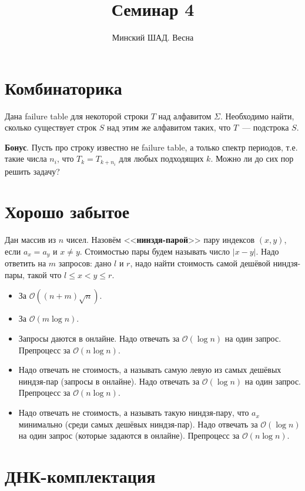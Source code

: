 \documentclass[addpoints]{exam}
\title{Семинар 4}
\author{Минский ШАД. Весна}
\begin{document}
\maketitle

\section{Комбинаторика}

Дана failure table для некоторой строки $T$ над алфавитом $\Sigma$. Необходимо найти, сколько существует строк $S$ над этим же алфавитом таких, что $T$~--- подстрока $S$.

\textbf{Бонус}. Пусть про строку известно не failure table, а только спектр периодов, т.е. такие числа $n_i$, что $T_k = T_{k+n_i}$ для любых подходящих $k$. Можно ли до сих пор решить задачу?

\section{Хорошо забытое}

Дан массив из $n$ чисел. Назовём <<\textbf{нинздя-парой}>> пару индексов $(x,y)$, если $a_x = a_y$ и $x \neq y$. Стоимостью пары будем называть число $|x - y|$. Надо ответить на $m$ запросов: дано $l$ и $r$, надо найти стоимость самой дешёвой ниндзя-пары, такой что $l \leqslant x < y \leqslant r$.

\begin{itemize}
\item За $\mathcal{O}((n + m) \sqrt{n})$.
\item За $\mathcal{O}(m \log{n})$.
\item Запросы даются в онлайне. Надо отвечать за $\mathcal{O}(\log{n})$ на один запрос. Препроцесс за $\mathcal{O}(n \log{n})$.
\item Надо отвечать не стоимость, а называть самую левую из самых дешёвых ниндзя-пар (запросы в онлайне). Надо отвечать за $\mathcal{O}(\log{n})$ на один запрос. Препроцесс за $\mathcal{O}(n \log{n})$.
\item Надо отвечать не стоимость, а называть такую ниндзя-пару, что $a_x$ минимально (среди самых дешёвых ниндзя-пар). Надо отвечать за $\mathcal{O}(\log{n})$ на один запрос (которые задаются в онлайне). Препроцесс за $\mathcal{O}(n \log{n})$.
\end{itemize}

\section{ДНК-комплектация}
\end{document}
